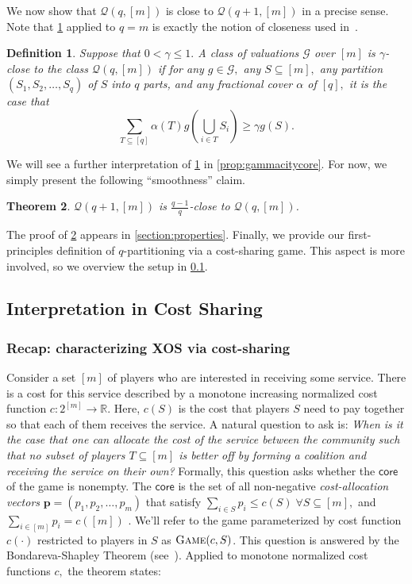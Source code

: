 \documentclass[11pt]{article}%
\newtheorem{theorem}{Theorem}
\newtheorem{definition}[theorem]{Definition}
\numberwithin{theorem}{subsection}
\newcommand{\game}{\textsc{Game}}
\newcommand{\classqm}{\mathcal{Q}(q,[m])}
\newcommand{\core}{{\mathsf{core}}}
\begin{document}
We now show that $\mathcal{Q}(q,[m])$ is close to $\mathcal{Q}(q+1,[m])$ in a precise sense. Note that \cref{def:closeness} applied to $q=m$ is exactly the notion of closeness used in~\cite{BhawalkarR11}. 

\begin{definition}
\label{def:closeness}
Suppose that $0< \gamma\le 1.$
A class of valuations $\mathcal{G}$ over $[m]$ is $\gamma$-close to the class $\classqm$ if for any $g\in \mathcal{G},$ any $S\subseteq [m],$ any partition $(S_1, S_2, \ldots, S_q)$ of $S$ into $q$ parts, and any 
fractional cover $\alpha$ of $[q],$ it is the case that
$$
\sum_{{T}\subseteq [q]} \alpha({T})g(\bigcup_{i \in {T}}S_i)\ge \gamma g(S). 
$$
\end{definition}

We will see a further interpretation of \cref{def:closeness} in \cref{prop:gammacitycore}. For now, we simply present the following ``smoothness'' claim.

\begin{theorem}
\label{thm:smoothness}
$\mathcal{Q}(q+1,[m])$ is  $\frac{q-1}{q}$-close to $\mathcal{Q}(q,[m])$.
 \end{theorem}

 The proof of \cref{thm:smoothness} appears in \cref{section:properties}. Finally, we provide our first-principles definition of $q$-partitioning via a cost-sharing game. This aspect is more involved, so we overview the setup in \cref{section:costsharing}.

\subsection{Interpretation in Cost Sharing}
\label{section:costsharing}

\subsubsection{Recap: characterizing XOS via cost-sharing}
Consider a set $[m]$ of players who are interested in receiving some service. There is a 
cost for this service described by a monotone increasing normalized cost function $c: 2^{[m]}\longrightarrow \mathbb{R}.$ Here, $c(S)$ is the cost that players $S$ need to pay together so that each of them receives the service. A natural question to ask is: \textit{When is it the case that one can allocate the cost of the service between the community such that no subset of players $T\subseteq [m]$ is better off by forming a coalition and receiving the service on their own?} Formally, this question asks whether the $\core$ of the game is nonempty. The $\core$ is the set of all non-negative \textit{cost-allocation vectors} $\mathbf{p} = (p_1, p_2, \ldots, p_m)$ that satisfy $\sum_{i\in S}p_i \le c(S) \; \forall S\subseteq [m],$ and $\sum_{i\in [m]}p_i = c([m])$ \cite[Definition 15.3]{AGTbook}. We'll refer to the game parameterized by cost function $c(\cdot)$ restricted to players in $S$ as $\game(c,S)$.
This question is answered by the Bondareva-Shapley Theorem (see~\cite[Theorem 15.6]{AGTbook}). Applied to monotone normalized cost functions $c,$ the theorem states:
\end{document}

